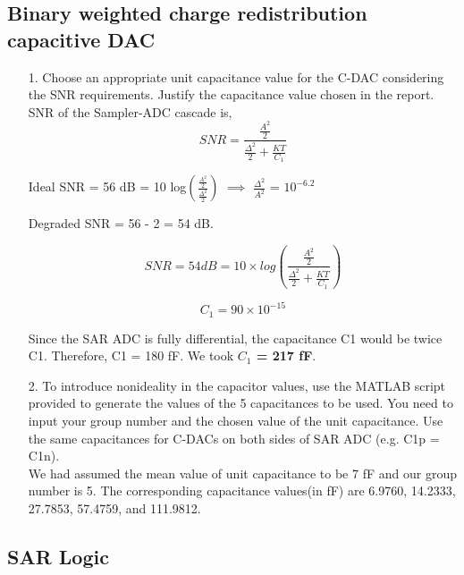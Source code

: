 \documentclass[a4paper,12pt]{article}
\begin{document}
\subsection{Binary weighted charge redistribution capacitive DAC}

\begin{itemize}
    \item[1.] Choose an appropriate unit capacitance value for the C-DAC considering the SNR requirements.
Justify the capacitance value chosen in the report.\\
SNR of the Sampler-ADC cascade is,
\begin{equation}
    SNR = \frac{\frac{A^2}{2}}{\frac{\Delta^2}{2}+\frac{KT}{C_1}}
\end{equation}

\noindent Ideal SNR = 56 dB = 10 log$\left( \frac{\frac{A^2}{2}}{\frac{\Delta^2}{2}}\right)$ $\implies$ $\frac{\Delta^2}{A^2}$ = $10^{-6.2}$

\noindent Degraded SNR = 56 - 2 = 54 dB.

\begin{equation}
    SNR = 54dB = 10\times log\left(  \frac{\frac{A^2}{2}}{\frac{\Delta^2}{2}+\frac{KT}{C_1}} \right)
\end{equation}

\begin{equation}
    C_1 = 90 \times 10^{-15}
\end{equation}


Since the SAR ADC is fully differential, the capacitance C1 would be twice C1. Therefore, C1 = 180 fF.
\noindent We took \textbf{$C_1$ = 217 fF}.

\item[2.] To introduce nonideality in the capacitor values, use the MATLAB script provided to generate the
values of the 5 capacitances to be used. You need to input your group number and the chosen value of the unit capacitance. Use the same capacitances for C-DACs on both sides of SAR ADC (e.g. C1p = C1n).\\
We had assumed the mean value of unit capacitance to be 7 fF and our group number is 5. The corresponding capacitance values(in fF) are 6.9760, 14.2333, 27.7853, 57.4759, and  111.9812.
\end{itemize}

\subsection{SAR Logic}
\end{document}

